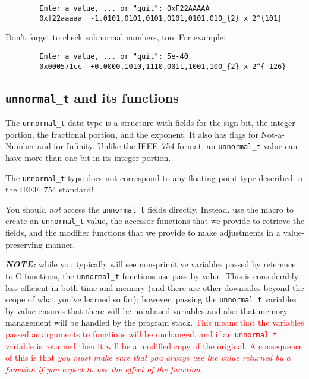 \begin{verbatim}
        Enter a value, ... or "quit": 0xF22AAAAA
        0xf22aaaaa	-1.0101,0101,0101,0101,0101,010_{2} x 2^{101}
\end{verbatim}

Don't forget to check subnormal numbers, too.
For example:

\begin{verbatim}
        Enter a value, ... or "quit": 5e-40
        0x000571cc	+0.0000,1010,1110,0011,1001,100_{2} x 2^{-126}
\end{verbatim}

\subsection{\texttt{unnormal\_t} and its functions} \label{subsec:unnormal}

The \lstinline{unnormal_t} data type is a structure with fields for the sign bit, the integer portion, the fractional portion, and the exponent.
It also has flags for Not-a-Number and for Infinity.
Unlike the IEEE~754 format, an \lstinline{unnormal_t} value can have more than one bit in its integer portion.

\hspace{-2cm}\colorbox{red!25}{The \lstinline{unnormal_t} type does not correspond to any floating point type described in the IEEE~754 standard!}

You should \textit{not} access the \lstinline{unnormal_t} fields directly.
Instead, use the  macro to create an \lstinline{unnormal_t} value, the accessor functions that we provide to retrieve the fields, and the modifier functions that we provide to make adjustments in a value-preserving manner.

\textit{\textbf{NOTE:}} while you typically will see non-primitive variables passed by reference to C functions, the \lstinline{unnormal_t} functions use pass-by-value.
This is considerably less efficient in both time and memory (and there are other downsides beyond the scope of what you've learned so far);
however, passing the \lstinline{unnormal_t} variables by value ensures that there will be no aliased variables and also that memory management will be handled by the program stack.
\textcolor{red}{This means that the variables passed as arguments to functions will be unchanged, and if an \lstinline{unnormal_t} variable is returned then it will be a modified copy of the original.
A consequence of this is that \textit{you must make sure that you always use the value returned by a function if you expect to use the effect of the function.}}


